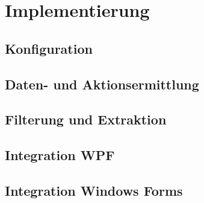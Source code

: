 \chapter{Implementierung}
\label{cha:implementierung}

\section{Konfiguration}
\label{sec:configuration_impl}

\section{Daten- und Aktionsermittlung}
\label{sec:data_collection_impl}

\section{Filterung und Extraktion}
\label{sec:data_extraction_impl}

\section{Integration WPF}
\label{sec:integration_wpf_impl}

\section{Integration Windows Forms}
\label{sec:integration_winforms_impl}